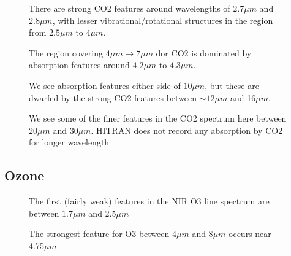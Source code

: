 \documentclass[12pt]{article}
\begin{document}
\vspace*{11.5cm}
\begin{figure}[htb]
\caption{There are strong CO2 features around wavelengths of $2.7\mu m$ and $2.8\mu m$, 
with lesser vibrational/rotational structures in the region from $2.5 \mu m$ to $4\mu m$.}
\end{figure}
\newpage

\vspace*{11.5cm}
\begin{figure}[htb]
\caption{The region covering $4\mu m \rightarrow 7\mu m$
 dor CO2 is dominated by absorption features around $4.2 \mu m$ to $4.3\mu m$.}
\end{figure}
\newpage


\vspace*{11.5cm}
\begin{figure}[htb]
\caption{We see absorption features either side of $10 \mu m$, but these are dwarfed by the
strong CO2 features between $\sim 12 \mu m$ and 16$\mu m$.}
\end{figure}
\newpage


\vspace*{11.5cm}
\begin{figure}[htb]
\caption{We see some of the finer features in the CO2 spectrum here
between  $20 \mu m$ and 30$\mu m$. HITRAN does not record any absorption by CO2 for longer wavelength}
\end{figure}
\newpage

\subsection{Ozone}

\vspace*{11.5cm}
\begin{figure}[htb]
\caption{The first (fairly weak) features
in the NIR O3 line spectrum are between   $1.7 \mu m$ and 2.5$\mu m$}
\end{figure}
\newpage

\vspace*{11.5cm}
\begin{figure}[htb]
\caption{The strongest feature for O3 between $4 \mu m$ and 8$\mu m$
occurs near 4.75$\mu m$}
\end{figure}
\newpage
\end{document}
